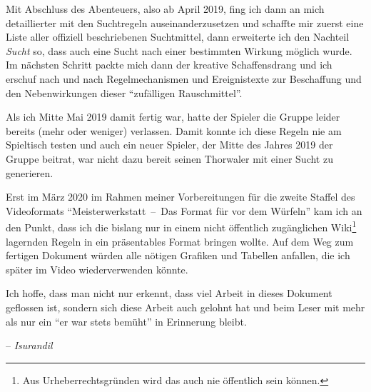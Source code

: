 Mit Abschluss des Abenteuers, also ab April 2019, fing ich dann an mich detaillierter mit den Suchtregeln auseinanderzusetzen und schaffte mir zuerst eine Liste aller offiziell beschriebenen Suchtmittel, dann erweiterte ich den Nachteil \emph{Sucht} so, dass auch eine Sucht nach einer bestimmten Wirkung möglich wurde. Im nächsten Schritt packte mich dann der kreative Schaffensdrang und ich erschuf nach und nach Regelmechanismen und Ereignistexte zur Beschaffung und den Nebenwirkungen dieser \enquote{zufälligen Rauschmittel}.

Als ich Mitte Mai 2019 damit fertig war, hatte der Spieler die Gruppe leider bereits (mehr oder weniger) verlassen. Damit konnte ich diese Regeln nie am Spieltisch testen und auch ein neuer Spieler, der Mitte des Jahres 2019 der Gruppe beitrat, war nicht dazu bereit seinen Thorwaler mit einer Sucht zu generieren.

Erst im März 2020 im Rahmen meiner Vorbereitungen für die zweite Staffel des Videoformats \enquote{Meisterwerkstatt~--~Das Format für vor dem Würfeln} kam ich an den Punkt, dass ich die bislang nur in einem nicht öffentlich zugänglichen Wiki\footnote{Aus Urheberrechtsgründen wird das auch nie öffentlich sein können.} lagernden Regeln in ein präsentables Format bringen wollte. Auf dem Weg zum fertigen Dokument würden alle nötigen Grafiken und Tabellen anfallen, die ich später im Video wiederverwenden könnte.

Ich hoffe, dass man nicht nur erkennt, dass viel Arbeit in dieses Dokument geflossen ist, sondern sich diese Arbeit auch gelohnt hat und beim Leser mit mehr als nur ein \enquote{er war stets bemüht} in Erinnerung bleibt.

\bigskip\noindent
{\raggedleft-- \emph{Isurandil}\par}

